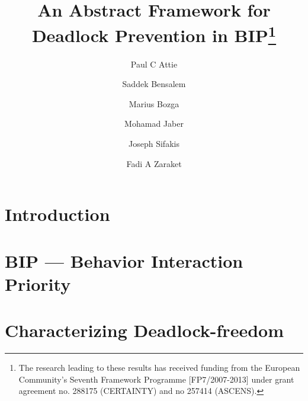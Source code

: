 \documentclass[11pt]{article}
\begin{document}
\title{An Abstract Framework for Deadlock Prevention in BIP\thanks{The research leading to these results has received funding from the 
European Community's Seventh Framework Programme [FP7/2007-2013] under 
grant agreement no. 288175 (CERTAINTY) and no 257414 (ASCENS).}
}


\author{Paul C Attie}

\author{Saddek Bensalem}

\author{Marius Bozga}

\author{Mohamad Jaber}

\author{Joseph Sifakis}

\author{Fadi A Zaraket}



\maketitle







\section{Introduction}
\label{s:intro}



\section{BIP --- Behavior Interaction Priority}
\label{s:bip}



\section{Characterizing Deadlock-freedom}
\label{s:characterize}

\end{document}
